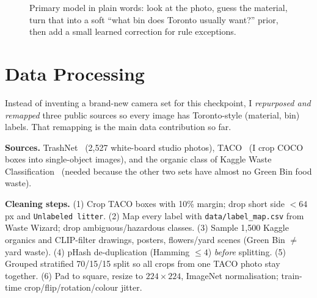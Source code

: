 \documentclass[final]{article}
\begin{document}
\begin{figure}[!h]
\centering
{}
\caption{Primary model in plain words: look at the photo, guess the material, turn that into a soft ``what bin does Toronto usually want?'' prior, then add a small learned correction for rule exceptions.}
\label{fig:arch}
\end{figure}

\section*{Data Processing}
Instead of inventing a brand-new camera set for this checkpoint, I \emph{repurposed and remapped} three public sources so every image has Toronto-style (material, bin) labels. That remapping is the main data contribution so far.

\textbf{Sources.} TrashNet~\cite{thung2016} (2,527 white-board studio photos), TACO~\cite{proenca2020} (I crop COCO boxes into single-object images), and the organic class of Kaggle Waste Classification~\cite{sekar2018} (needed because the other two sets have almost no Green Bin food waste).

\textbf{Cleaning steps.} (1) Crop TACO boxes with 10\% margin; drop short side $<64$\,px and \texttt{Unlabeled litter}. (2) Map every label with \texttt{data/label\_map.csv} from Waste Wizard; drop ambiguous/hazardous classes. (3) Sample 1,500 Kaggle organics and CLIP-filter drawings, posters, flowers/yard scenes (Green Bin $\neq$ yard waste). (4) pHash de-duplication (Hamming $\le4$) \emph{before} splitting. (5) Grouped stratified 70/15/15 split so all crops from one TACO photo stay together. (6) Pad to square, resize to $224\times224$, ImageNet normalisation; train-time crop/flip/rotation/colour jitter.
\end{document}
